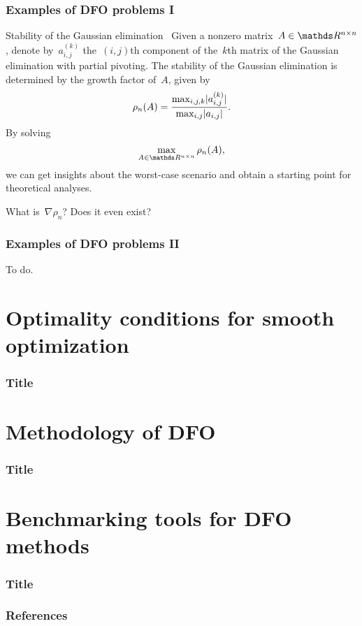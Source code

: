 \documentclass{polyu-presentation}
\begin{document}
\begin{frame}
    \frametitle{Examples of DFO problems I}

    \begin{block}{Stability of the Gaussian elimination~\parencite{Higham_1993}}
        Given a nonzero matrix~$A \in \R^{n \times n}$, denote by~$a_{i, j}^{(k)}$ the~$(i, j)$th component of the~$k$th matrix of the \alert{Gaussian elimination with partial pivoting}.
        The \alert{stability} of the Gaussian elimination is determined by the \alert{growth factor} of~$A$, given by
        \begin{equation*}
            \rho_n(A) = \frac{\max_{i, j, k} \lvert a_{i, j}^{(k)}\rvert}{\max_{i, j} \lvert a_{i, j}\rvert}.
        \end{equation*}
        By solving
        \begin{equation*}
            \max_{A \in \R^{n \times n}} \rho_n(A),
        \end{equation*}
        we can get insights about the \alert{worst-case scenario} and obtain a starting point for \alert{theoretical analyses}.
    \end{block}

    \bigskip

    What is~\alert{$\nabla \rho_n$}? Does it even exist?
\end{frame}

\begin{frame}
    \frametitle{Examples of DFO problems II}

    To do.
\end{frame}

\section{Optimality conditions for smooth optimization}

\begin{frame}
    \frametitle{Title}
\end{frame}

\section{Methodology of DFO}

\begin{frame}
    \frametitle{Title}
\end{frame}

\section{Benchmarking tools for DFO methods}

\begin{frame}
    \frametitle{Title}

    \parencite{Dolan_More_2002,More_Wild_2009,Gould_Scott_2016}
\end{frame}

\appendix

\begin{frame}[t,allowframebreaks]
    \frametitle{References}

	\printbibliography
\end{frame}
\end{document}
